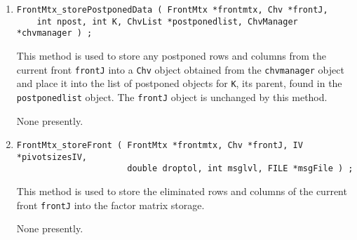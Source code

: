 \begin{enumerate}
{Chv} objects.
The number of delayed rows and columns is returned in {\tt *pndelay}
--- this is used during the factorization of the front that
follows immediately.
\par {}
None presently.
\item
\begin{verbatim}
FrontMtx_storePostponedData ( FrontMtx *frontmtx, Chv *frontJ, 
    int npost, int K, ChvList *postponedlist, ChvManager *chvmanager ) ;
\end{verbatim}
This method is used to store any postponed rows and columns from
the current front {\tt frontJ} into a {\tt Chv} object obtained
from the {\tt chvmanager} object and place it into the list of
postponed objects for {\tt K}, its parent, found in the {\tt
postponedlist} object.
The {\tt frontJ} object is unchanged by this method.
\par {}
None presently.
\item
\begin{verbatim}
FrontMtx_storeFront ( FrontMtx *frontmtx, Chv *frontJ, IV *pivotsizesIV,
                      double droptol, int msglvl, FILE *msgFile ) ;
\end{verbatim}
This method is used to store the eliminated rows and columns of the
current front {\tt frontJ} into the factor matrix storage.
\par {}
None presently.
\end{enumerate}
\par
